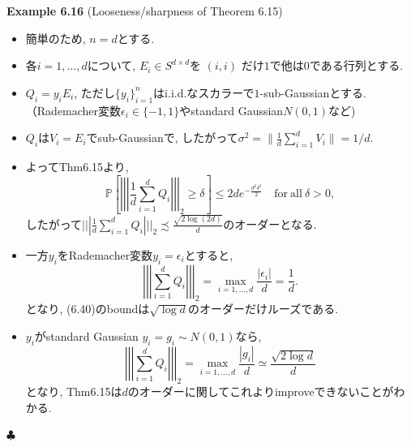 \documentclass[unicode,aspectratio=169,11pt]{beamer}
\def\endexample{\hfill $\clubsuit$}
\newcommand{\bb}{\mathbb}
\begin{document}
\begin{frame}{}{}
  {\bf Example 6.16} (Looseness/sharpness of Theorem 6.15)
  \begin{itemize}
    \item 簡単のため, $n = d$とする.
    \item 各$i = 1,\dots,d$について, $E_i \in S^{d \times d}$を $(i,i)$ だけ$1$で他は$0$である行列とする.
    \item $Q_i = y_i E_i$, ただし$\{y_i\}_{i=1}^n$はi.i.d.なスカラーで$1$-sub-Gaussianとする.（Rademacher変数$\epsilon_i \in \{-1, 1\}$やstandard Gaussian$N(0,1)$など)
    \item $Q_i$は$V_i = E_i$でsub-Gaussianで, したがって$\sigma^2 = \|\frac{1}{d}\sum_{i=1}^dV_i\| = 1/d$.
    \item よってThm6.15より,
            \[
              \bb{P}\left[\left|\left|\left|\frac{1}{d}\sum_{i=1}^d Q_i\right|\right|\right|_2 \ge \delta\right]
              \le 2de^{-\frac{d^2\delta^2}{2}}
              \quad \mathrm{for\ all}\ \delta > 0,
              \tag{6.40}
            \]
            したがって$|||\frac{1}{d}\sum_{i=1}^d Q_i|||_2 \precsim \frac{\sqrt{2\log(2d)}}{d}$のオーダーとなる.
  \end{itemize}
\end{frame}

\begin{frame}
  \begin{itemize}
    \item 一方$y_i$をRademacher変数$y_i = \epsilon_i$とすると,
          \[
            \left|\left|\left|\sum_{i=1}^d Q_i\right|\right|\right|_2 = \max_{i=1,\dots,d}\frac{|\epsilon_i|}{d} = \frac{1}{d}.
          \]
          となり, (6.40)のboundは$\sqrt{\log d}$のオーダーだけルーズである.
    \item $y_i$がstandard Gaussian $y_i = g_i \sim N(0,1)$なら,
          \[
            \left|\left|\left|\sum_{i=1}^d Q_i\right|\right|\right|_2 = \max_{i=1,\dots,d}\frac{|g_i|}{d} \simeq \frac{\sqrt{2 \log d}}{d}
          \]
          となり, Thm6.15は$d$のオーダーに関してこれよりimproveできないことがわかる.
  \end{itemize}
  \endexample
\end{frame}
\end{document}
